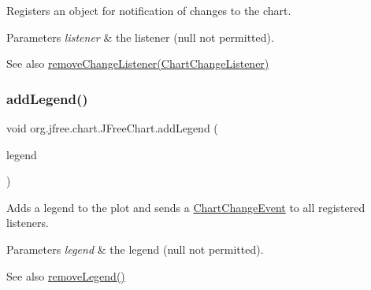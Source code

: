 Registers an object for notification of changes to the chart.


\begin{DoxyParams}{Parameters}
{\em listener} & the listener ({\ttfamily null} not permitted).\\
\hline
\end{DoxyParams}
\begin{DoxySeeAlso}{See also}
\mbox{\hyperlink{classorg_1_1jfree_1_1chart_1_1_j_free_chart_ab975fd93d4df150231ac1e413bae9c33}{remove\+Change\+Listener(\+Chart\+Change\+Listener)}} 
\end{DoxySeeAlso}
\mbox{\label{classorg_1_1jfree_1_1chart_1_1_j_free_chart_ae44c0da2bbdccd9921a15df955f7c20b}} 
\subsubsection{\texorpdfstring{add\+Legend()}{addLegend()}}
{\footnotesize\ttfamily void org.\+jfree.\+chart.\+J\+Free\+Chart.\+add\+Legend (\begin{DoxyParamCaption}\item[{\mbox{\hyperlink{classorg_1_1jfree_1_1chart_1_1title_1_1_legend_title}{Legend\+Title}}}]{legend }\end{DoxyParamCaption})}

Adds a legend to the plot and sends a \mbox{\hyperlink{}{Chart\+Change\+Event}} to all registered listeners.


\begin{DoxyParams}{Parameters}
{\em legend} & the legend ({\ttfamily null} not permitted).\\
\hline
\end{DoxyParams}
\begin{DoxySeeAlso}{See also}
\mbox{\hyperlink{classorg_1_1jfree_1_1chart_1_1_j_free_chart_acde6bda611f15c2f55255a42280b5fd9}{remove\+Legend()}} 
\end{DoxySeeAlso}
\mbox{\label{classorg_1_1jfree_1_1chart_1_1_j_free_chart_a01fa8b4979ad1166520db31d94b99eb1}} 
